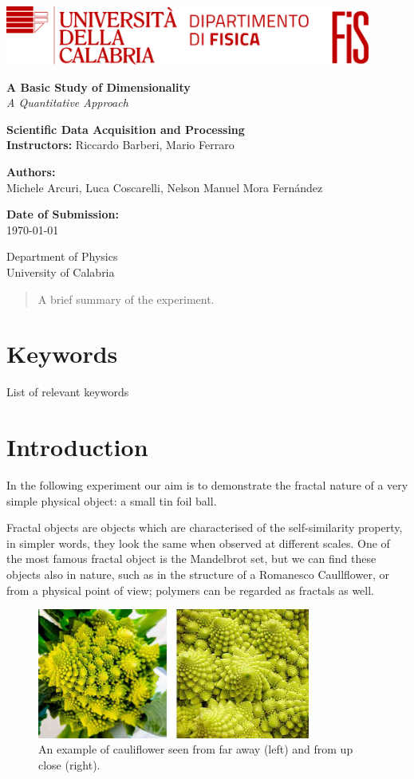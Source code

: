 \documentclass[a4paper,12pt]{article}
\newcommand{\customtitlepage}{
    

    \begin{titlepage}
        \includegraphics[width=0.9\textwidth]{logo.png}\\
        \centering
        \vspace*{1cm}
        
        \Huge\textbf{A Basic Study of Dimensionality}\\
        \vspace{0.5cm}
        \LARGE\textit{A Quantitative Approach}\\
        \vspace{1.5cm}
        
        \textbf{Scientific Data Acquisition and Processing} \\
        \textbf{Instructors:} Riccardo Barberi, Mario Ferraro\\
        \vspace{0.5cm}
        
        \textbf{Authors:}\\
        \large Michele Arcuri, Luca Coscarelli, Nelson Manuel Mora Fernández\\
        \vfill
        
        \large \textbf{Date of Submission:}\\
        \today\\
        \vspace{1.5cm}
        
        \small
        Department of Physics \\
        University of Calabria\\
        \vspace{0.5cm}
    \end{titlepage}
}
\begin{document}
\customtitlepage

\begin{abstract}
    A brief summary of the experiment.
\end{abstract}


\section*{Keywords}
List of relevant keywords 

\newpage

\tableofcontents
\newpage

\section{Introduction}
\par In the following experiment our aim is to demonstrate the fractal nature 
of a very simple physical object: a small tin foil ball. 
 
\par Fractal objects are objects which are characterised of the self-similarity 
property, in simpler words, they look the same when observed at different scales.
One of the most famous fractal object is the Mandelbrot set, but we can find these 
objects also in nature, such as in the structure of a Romanesco Caullflower, or 
from a physical point of view; polymers can be regarded as fractals as well.

\begin{figure}[h]
    \centering
    \includegraphics[width = 0.8\textwidth]{Cauliflower.jpg}
    \caption{An example of cauliflower seen from far away (left) and from up close (right).}
    \label{fig:Cauliflower}
\end{figure}
\end{document}
